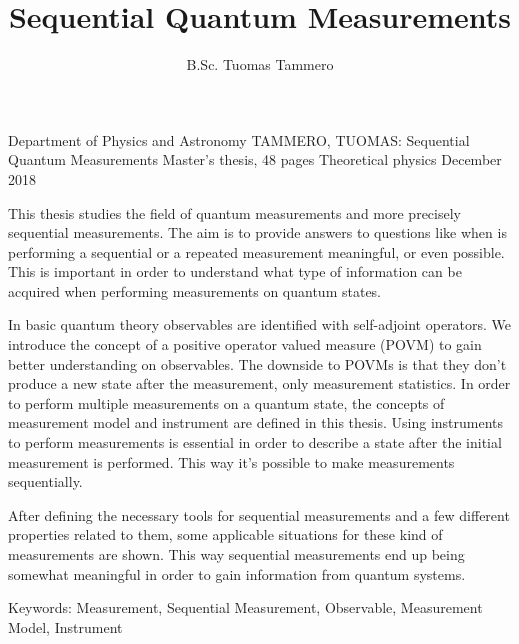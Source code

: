\documentclass[a4paper,12pt]{wihuri}
\theoremstyle{definition}
\numberwithin{definition}{section}
\numberwithin{example}{section}
\numberwithin{theorem}{section}
\numberwithin{proposition}{section}
\numberwithin{lemma}{section}
\begin{document}
\title{Sequential Quantum Measurements}%
\author{B.Sc. Tuomas Tammero}
\maketitle




\begin{tiivistelma}%
        {Department of Physics and Astronomy}%
        {TAMMERO, TUOMAS:}%
        {Sequential Quantum Measurements}%
        {Master's thesis, 48 pages}%
        {Theoretical physics}%
        {December 2018}%

This thesis studies the field of quantum measurements and more precisely sequential measurements. The aim is to provide answers to questions like when is performing a sequential or a repeated measurement meaningful, or even possible. This is important in order to understand what type of information can be acquired when performing measurements on quantum states. 

In basic quantum theory observables are identified with self-adjoint operators. We introduce the concept of a positive operator valued measure (POVM) to gain better understanding on observables. The downside to POVMs is that they don't produce a new state after the measurement, only measurement statistics. In order to perform multiple measurements on a quantum state, the concepts of measurement model and instrument are defined in this thesis. Using instruments to perform measurements is essential in order to describe a state after the initial measurement is performed. This way it's possible to make measurements sequentially.

After defining the necessary tools for sequential measurements and a few different properties related to them, some applicable situations for these kind of measurements are shown. This way sequential measurements end up being somewhat meaningful in order to gain information from quantum systems.




\noindent Keywords: Measurement, Sequential Measurement, Observable, Measurement Model, Instrument
\end{tiivistelma}
\end{document}
